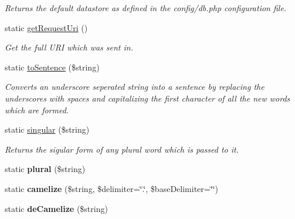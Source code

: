 \begin{DoxyCompactItemize}
\begin{DoxyCompactList}\small\item\em Returns the default datastore as defined in the config/db.php configuration file. \item\end{DoxyCompactList}\item 
\hypertarget{class_ntentan_a3fe6be344ec5da120c0980fd76fc6a7d}{
static \hyperlink{class_ntentan_a3fe6be344ec5da120c0980fd76fc6a7d}{getRequestUri} ()}
\label{class_ntentan_a3fe6be344ec5da120c0980fd76fc6a7d}

\begin{DoxyCompactList}\small\item\em Get the full URI which was sent in. \item\end{DoxyCompactList}\item 
static \hyperlink{class_ntentan_a140030a51598f0ab28fb2b1eb9d66943}{toSentence} (\$string)
\begin{DoxyCompactList}\small\item\em Converts an underscore seperated string into a sentence by replacing the underscores with spaces and capitalizing the first character of all the new words which are formed. \item\end{DoxyCompactList}\item 
static \hyperlink{class_ntentan_af20cd339e8109e82087b070c25e71afc}{singular} (\$string)
\begin{DoxyCompactList}\small\item\em Returns the sigular form of any plural word which is passed to it. \item\end{DoxyCompactList}\item 
\hypertarget{class_ntentan_a476659fbbb9a4f15dc7d63ab30101f95}{
static {\bfseries plural} (\$string)}
\label{class_ntentan_a476659fbbb9a4f15dc7d63ab30101f95}

\item 
\hypertarget{class_ntentan_a68793e6d96f6485e4e271801615acd79}{
static {\bfseries camelize} (\$string, \$delimiter=\char`\"{}.\char`\"{}, \$baseDelimiter=\char`\"{}\char`\"{})}
\label{class_ntentan_a68793e6d96f6485e4e271801615acd79}

\item 
\hypertarget{class_ntentan_a2db5063abf786553fd1d774077cbe3ee}{
static {\bfseries deCamelize} (\$string)}
\label{class_ntentan_a2db5063abf786553fd1d774077cbe3ee}


\end{DoxyCompactItemize}
